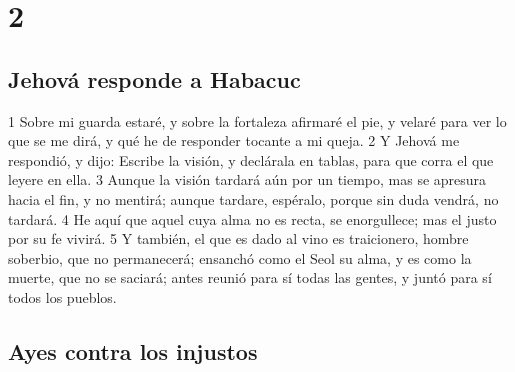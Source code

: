 \chapter{2}

\section*{Jehová responde a Habacuc}

1 Sobre mi guarda estaré, y sobre la fortaleza afirmaré el pie, y velaré para ver lo que se me dirá, y qué he de responder tocante a mi queja.
2 Y Jehová me respondió, y dijo: Escribe la visión, y declárala en tablas, para que corra el que leyere en ella.
3 Aunque la visión tardará aún por un tiempo, mas se apresura hacia el fin, y no mentirá; aunque tardare, espéralo, porque sin duda vendrá, no tardará. 
4 He aquí que aquel cuya alma no es recta, se enorgullece; mas el justo por su fe vivirá. 
5 Y también, el que es dado al vino es traicionero, hombre soberbio, que no permanecerá; ensanchó como el Seol su alma, y es como la muerte, que no se saciará; antes reunió para sí todas las gentes, y juntó para sí todos los pueblos.

\section*{Ayes contra los injustos}

